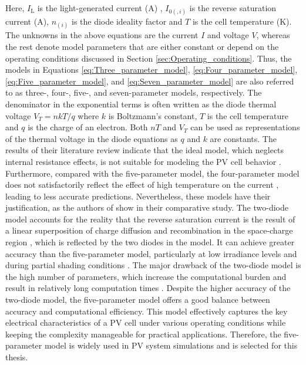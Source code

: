 \noindent
Here, \(I_{\text{L}}\) is the light-generated current (\si{\ampere}) , \(I_{0(,i)}\) is the reverse saturation
current (\si{\ampere}), \(n_{(i)}\) is the diode ideality factor and \(T\) is the cell temperature (\si{\kelvin}).
The unknowns in the above equations are the current \(I\) and voltage \(V\), whereas the rest
denote model parameters that are either constant or depend on the operating conditions
discussed in Section \ref{sec:Operating_conditions}. Thus, the models in Equations
\ref{eq:Three_parameter_model}, \ref{eq:Four_parameter_model}, \ref{eq:Five_parameter_model},
and \ref{eq:Seven_parameter_model} are also referred to as three-, four-, five-,
and seven-parameter models, respectively. The denominator in the exponential terms
is often written as the diode thermal voltage \(V_{T} = nkT/q\) where \(k\) is
Boltzmann's constant, \(T\) is the cell temperature and \(q\) is the charge
of an electron. Both \(nT\) and \(V_{T}\) can be used as representations
of the thermal voltage in the diode equations as \(q\) and \(k\) are constants.
The results of their literature review indicate that the ideal model, which
neglects internal resistance effects, is not suitable for modeling the PV cell
behavior \cite{Mazhari2006}. Furthermore, compared with the five-parameter model,
the four-parameter model does not satisfactorily reflect the effect of high
temperature on the current \cite{Celik2007, Karamirad2013}, leading to less
accurate predictions. Nevertheless, these models have their justification,
as the authors of \cite{Dolora2015} show in their comparative study.
The two-diode model accounts for the reality that the reverse saturation
current is the result of a linear superposition of charge diffusion and
recombination in the space-charge region \cite{Gow1999}, which is reflected
by the two diodes in the model. It can achieve greater accuracy than the
five-parameter model, particularly at low irradiance levels and during
partial shading conditions \cite{Ishaque2011}. The major drawback of the
two-diode model is the high number of parameters, which increase the
computational burden and result in relatively long computation times
\cite{Ishaque2011_2, Ishaque2011_1}.
Despite the higher accuracy of the two-diode model, the five-parameter model
offers a good balance between accuracy and computational efficiency.
This model effectively captures the key electrical
characteristics of a PV cell under various operating conditions while keeping
the complexity manageable for practical applications. Therefore, the
five-parameter model is widely used in PV system simulations and is selected
for this thesis.

